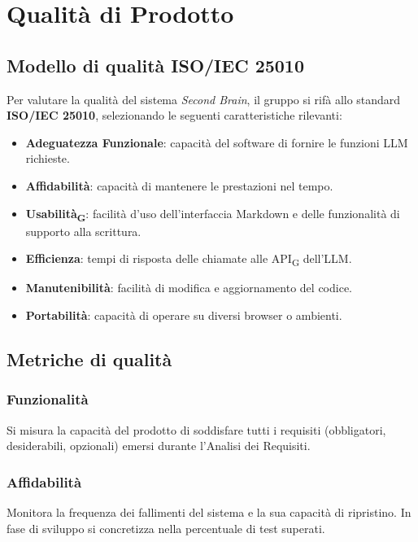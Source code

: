 \section{Qualità di Prodotto}

\subsection{Modello di qualità ISO/IEC 25010}
Per valutare la qualità del sistema \textit{Second Brain}, il gruppo si rifà allo standard \textbf{ISO/IEC 25010}, selezionando le seguenti caratteristiche rilevanti:
\begin{itemize}
	\item \textbf{Adeguatezza Funzionale}: capacità del software di fornire le funzioni LLM richieste.
	\item \textbf{Affidabilità}: capacità di mantenere le prestazioni nel tempo.
	\item \textbf{Usabilità\textsubscript{G}}: facilità d'uso dell'interfaccia Markdown e delle funzionalità di supporto alla scrittura.
	\item \textbf{Efficienza}: tempi di risposta delle chiamate alle API\textsubscript{G} dell'LLM.
	\item \textbf{Manutenibilità}: facilità di modifica e aggiornamento del codice.
	\item \textbf{Portabilità}: capacità di operare su diversi browser o ambienti.
\end{itemize}

\subsection{Metriche di qualità}

\subsubsection{Funzionalità}
Si misura la capacità del prodotto di soddisfare tutti i requisiti (obbligatori, desiderabili, opzionali) emersi durante l'Analisi dei Requisiti.

\subsubsection{Affidabilità}
Monitora la frequenza dei fallimenti del sistema e la sua capacità di ripristino. In fase di sviluppo si concretizza nella percentuale di test superati.

